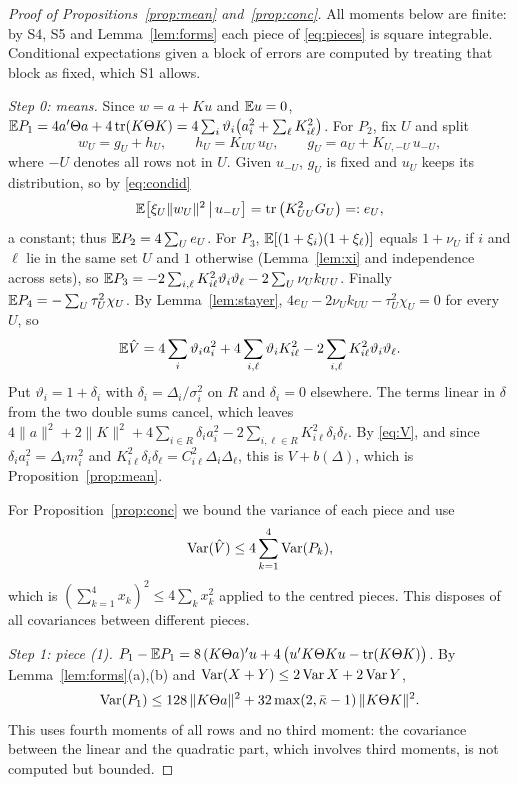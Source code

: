 \begin{proof}[Proof of Propositions~\ref{prop:mean} and~\ref{prop:conc}]
All moments below are finite: by S4, S5 and Lemma~\ref{lem:forms} each piece of \eqref{eq:pieces} is
square integrable. Conditional expectations given a block of errors are computed by treating that
block as fixed, which S1 allows.

\medskip\noindent\emph{Step 0: means.} Since $w=a+Ku$ and $\mathbb{E} u=0$,
$\mathbb{E} P_1=4a'\Theta a+4\operatorname{tr}(K\Theta K)=4\sum_i\vartheta_i\big(a_i^2+\sum_\ell K_{i\ell}^2\big)$. For
$P_2$, fix $U$ and split
\begin{equation}\label{eq:gh}
w_U=g_U+h_U,\qquad h_U=K_{UU}\,u_U,\qquad g_U=a_U+K_{U,-U}\,u_{-U},
\end{equation}
where $-U$ denotes all rows not in $U$. Given $u_{-U}$, $g_U$ is fixed and $u_U$ keeps its
distribution, so by \eqref{eq:condid}
\begin{equation}\label{eq:eU}
\mathbb{E}\big[\xi_U\|w_U\|^2\,\big|\,u_{-U}\big]=\operatorname{tr}\big(K_{UU}^2G_U\big)=:e_U ,
\end{equation}
a constant; thus $\mathbb{E} P_2=4\sum_Ue_U$. For $P_3$, $\mathbb{E}[(1+\xi_i)(1+\xi_\ell)]$ equals $1+\nu_U$ if $i$
and $\ell$ lie in the same set $U$ and $1$ otherwise (Lemma~\ref{lem:xi} and independence across
sets), so $\mathbb{E} P_3=-2\sum_{i,\ell}K_{i\ell}^2\vartheta_i\vartheta_\ell-2\sum_U\nu_Uk_{UU}$. Finally
$\mathbb{E} P_4=-\sum_U\tau_U^2\chi_U$. By Lemma~\ref{lem:stayer}, $4e_U-2\nu_Uk_{UU}-\tau_U^2\chi_U=0$ for every $U$, so
\[
\mathbb{E}\hat V=4\sum_i\vartheta_ia_i^2+4\sum_{i,\ell}\vartheta_iK_{i\ell}^2-2\sum_{i,\ell}K_{i\ell}^2\vartheta_i\vartheta_\ell .
\]
Put $\vartheta_i=1+\delta_i$ with $\delta_i=\Delta_i/\sigma_i^2$ on $R$ and $\delta_i=0$ elsewhere. The
terms linear in $\delta$ from the two double sums cancel, which leaves
$4\|a\|^2+2\|K\|^2+4\sum_{i\in R}\delta_ia_i^2-2\sum_{i,\ell\in R}K_{i\ell}^2\delta_i\delta_\ell$. By
\eqref{eq:V}, and since $\delta_ia_i^2=\Delta_im_i^2$ and
$K_{i\ell}^2\delta_i\delta_\ell=C_{i\ell}^2\Delta_i\Delta_\ell$, this is $V+b(\Delta)$, which is Proposition~\ref{prop:mean}.

\medskip\noindent For Proposition~\ref{prop:conc} we bound the variance of each piece and use
\begin{equation}\label{eq:four}
\operatorname{Var}(\hat V)\le4\sum_{k=1}^4\operatorname{Var}(P_k),
\end{equation}
which is $(\sum_{k=1}^4x_k)^2\le4\sum_kx_k^2$ applied to the centred pieces. This disposes of all
covariances between different pieces.

\medskip\noindent\emph{Step 1: piece (1).} $P_1-\mathbb{E} P_1=8\,(K\Theta a)'u+4\,\big(u'K\Theta Ku-\operatorname{tr}(K\Theta K)\big)$.
By Lemma~\ref{lem:forms}(a),(b) and $\operatorname{Var}(X+Y)\le2\operatorname{Var} X+2\operatorname{Var} Y$,
\[
\operatorname{Var}(P_1)\le128\,\|K\Theta a\|^2+32\max(2,\bar\kappa-1)\,\|K\Theta K\|^2 .
\]
This uses fourth moments of all rows and no third moment: the covariance between the linear
and the quadratic part, which involves third moments, is not computed but bounded.


\end{proof}
